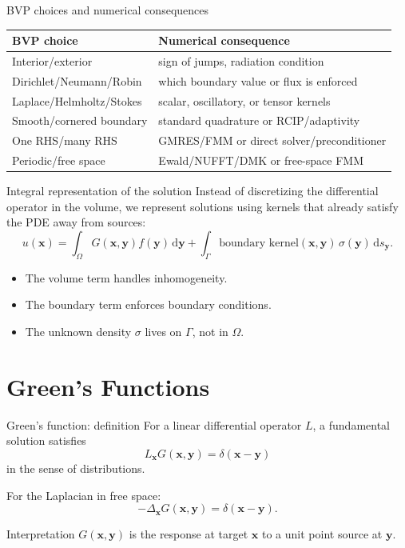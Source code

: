 \documentclass[aspectratio=169,11pt]{beamer}
\newcommand{\dd}{\,\mathrm d}
\newcommand{\x}{\bm{x}}
\newcommand{\y}{\bm{y}}
\begin{document}
\begin{frame}{BVP choices and numerical consequences}
\small
\begin{center}
\renewcommand{\arraystretch}{1.22}
\begin{tabular}{ll}
\toprule
BVP choice & Numerical consequence \\
\midrule
Interior/exterior & sign of jumps, radiation condition \\
Dirichlet/Neumann/Robin & which boundary value or flux is enforced \\
Laplace/Helmholtz/Stokes & scalar, oscillatory, or tensor kernels \\
Smooth/cornered boundary & standard quadrature or RCIP/adaptivity \\
One RHS/many RHS & GMRES/FMM or direct solver/preconditioner \\
Periodic/free space & Ewald/NUFFT/DMK or free-space FMM \\
\bottomrule
\end{tabular}
\end{center}
\end{frame}

\begin{frame}{Integral representation of the solution}
\small
Instead of discretizing the differential operator in the volume, we represent
solutions using kernels that already satisfy the PDE away from sources:
\[
  u(\x)=\int_\Omega G(\x,\y)f(\y)\dd\y
  +\int_{\Gamma}\text{boundary kernel}(\x,\y)\,\sigma(\y)\dd s_{\y}.
\]

\begin{itemize}
  \item The volume term handles inhomogeneity.
  \item The boundary term enforces boundary conditions.
  \item The unknown density $\sigma$ lives on $\Gamma$, not in $\Omega$.
\end{itemize}
\end{frame}

\section{Green's Functions}

\begin{frame}{Green's function: definition}
\small
For a linear differential operator $L$, a fundamental solution satisfies
\[
  L_{\x}G(\x,\y)=\delta(\x-\y)
\]
in the sense of distributions.

For the Laplacian in free space:
\[
  -\Delta_{\x}G(\x,\y)=\delta(\x-\y).
\]

\begin{block}{Interpretation}
$G(\x,\y)$ is the response at target $\x$ to a unit point source at $\y$.
\end{block}
\end{frame}
\end{document}

